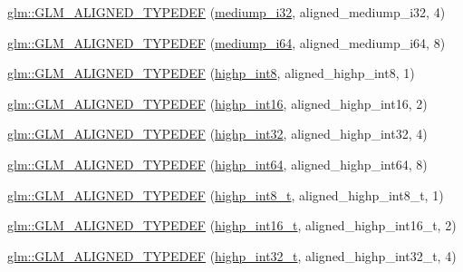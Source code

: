 \begin{DoxyCompactItemize}
\hyperlink{group__gtx__type__aligned_ga63b882e29170d428463d99c3d630acc6}{glm\+::\+G\+L\+M\+\_\+\+A\+L\+I\+G\+N\+E\+D\+\_\+\+T\+Y\+P\+E\+D\+EF} (\hyperlink{group__gtc__type__precision_ga5e00ec824eb55968a6b6496f294d8c07}{mediump\+\_\+i32}, aligned\+\_\+mediump\+\_\+i32, 4)
\item 
\hyperlink{group__gtx__type__aligned_ga8b20507bb048c1edea2d441cc953e6f0}{glm\+::\+G\+L\+M\+\_\+\+A\+L\+I\+G\+N\+E\+D\+\_\+\+T\+Y\+P\+E\+D\+EF} (\hyperlink{group__gtc__type__precision_ga90fedf6c701ffbe00535156715e50787}{mediump\+\_\+i64}, aligned\+\_\+mediump\+\_\+i64, 8)
\item 
\hyperlink{group__gtx__type__aligned_ga56c5ca60813027b603c7b61425a0479d}{glm\+::\+G\+L\+M\+\_\+\+A\+L\+I\+G\+N\+E\+D\+\_\+\+T\+Y\+P\+E\+D\+EF} (\hyperlink{group__gtc__type__precision_ga57c86999e666760c304453f9bfdc09d1}{highp\+\_\+int8}, aligned\+\_\+highp\+\_\+int8, 1)
\item 
\hyperlink{group__gtx__type__aligned_ga7a751b3aff24c0259f4a7357c2969089}{glm\+::\+G\+L\+M\+\_\+\+A\+L\+I\+G\+N\+E\+D\+\_\+\+T\+Y\+P\+E\+D\+EF} (\hyperlink{group__gtc__type__precision_gaf0430ed80e88c0d1dfbe47f359659c81}{highp\+\_\+int16}, aligned\+\_\+highp\+\_\+int16, 2)
\item 
\hyperlink{group__gtx__type__aligned_ga70cd2144351c556469ee6119e59971fc}{glm\+::\+G\+L\+M\+\_\+\+A\+L\+I\+G\+N\+E\+D\+\_\+\+T\+Y\+P\+E\+D\+EF} (\hyperlink{group__gtc__type__precision_gaa2045c92b9553d463191af6a20e997bb}{highp\+\_\+int32}, aligned\+\_\+highp\+\_\+int32, 4)
\item 
\hyperlink{group__gtx__type__aligned_ga46bbf08dc004d8c433041e0b5018a5d3}{glm\+::\+G\+L\+M\+\_\+\+A\+L\+I\+G\+N\+E\+D\+\_\+\+T\+Y\+P\+E\+D\+EF} (\hyperlink{group__gtc__type__precision_ga7ffb27943e9569800979081bc548621c}{highp\+\_\+int64}, aligned\+\_\+highp\+\_\+int64, 8)
\item 
\hyperlink{group__gtx__type__aligned_gab3e10c77a20d1abad2de1c561c7a5c18}{glm\+::\+G\+L\+M\+\_\+\+A\+L\+I\+G\+N\+E\+D\+\_\+\+T\+Y\+P\+E\+D\+EF} (\hyperlink{group__gtc__type__precision_ga417701b99e6e7992f35ab2ef694f88b2}{highp\+\_\+int8\+\_\+t}, aligned\+\_\+highp\+\_\+int8\+\_\+t, 1)
\item 
\hyperlink{group__gtx__type__aligned_ga968f30319ebeaca9ebcd3a25a8e139fb}{glm\+::\+G\+L\+M\+\_\+\+A\+L\+I\+G\+N\+E\+D\+\_\+\+T\+Y\+P\+E\+D\+EF} (\hyperlink{group__gtc__type__precision_ga07d318d61472e75238e53b9642227672}{highp\+\_\+int16\+\_\+t}, aligned\+\_\+highp\+\_\+int16\+\_\+t, 2)
\item 
\hyperlink{group__gtx__type__aligned_gaae773c28e6390c6aa76f5b678b7098a3}{glm\+::\+G\+L\+M\+\_\+\+A\+L\+I\+G\+N\+E\+D\+\_\+\+T\+Y\+P\+E\+D\+EF} (\hyperlink{group__gtc__type__precision_ga783d077a513c1f475f6cdb406b4238c3}{highp\+\_\+int32\+\_\+t}, aligned\+\_\+highp\+\_\+int32\+\_\+t, 4)

\end{DoxyCompactItemize}
